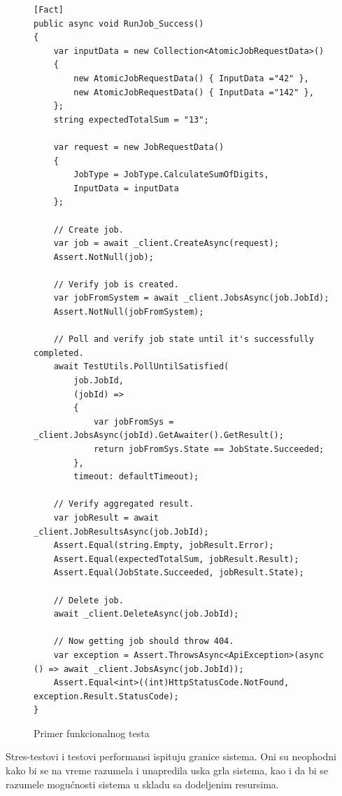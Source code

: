 \documentclass[12pt,oneside]{memoir}
\begin{document}
\begin{figure}[h!]
\centering
\begin{lstlisting}
[Fact]
public async void RunJob_Success()
{
	var inputData = new Collection<AtomicJobRequestData>()
	{
		new AtomicJobRequestData() { InputData ="42" },
		new AtomicJobRequestData() { InputData ="142" },
	};
	string expectedTotalSum = "13";

	var request = new JobRequestData()
	{
		JobType = JobType.CalculateSumOfDigits,
		InputData = inputData
	};

	// Create job.
	var job = await _client.CreateAsync(request);
	Assert.NotNull(job);

	// Verify job is created.
	var jobFromSystem = await _client.JobsAsync(job.JobId);
	Assert.NotNull(jobFromSystem);

	// Poll and verify job state until it's successfully completed.
	await TestUtils.PollUntilSatisfied(
		job.JobId,
		(jobId) =>
		{
			var jobFromSys = _client.JobsAsync(jobId).GetAwaiter().GetResult();
			return jobFromSys.State == JobState.Succeeded;
		},
		timeout: defaultTimeout);

	// Verify aggregated result.
	var jobResult = await _client.JobResultsAsync(job.JobId);
	Assert.Equal(string.Empty, jobResult.Error);
	Assert.Equal(expectedTotalSum, jobResult.Result);
	Assert.Equal(JobState.Succeeded, jobResult.State);

	// Delete job.
	await _client.DeleteAsync(job.JobId);

	// Now getting job should throw 404.
	var exception = Assert.ThrowsAsync<ApiException>(async () => await _client.JobsAsync(job.JobId));
	Assert.Equal<int>((int)HttpStatusCode.NotFound, exception.Result.StatusCode);
}
\end{lstlisting}
\caption{Primer funkcionalnog testa}
\label{fig:teste2e}
\end{figure}

Stres-testovi i testovi performansi ispituju granice sistema. Oni su neophodni kako bi se na vreme razumela i unapredila uska grla sistema, kao i da bi se razumele mogućnosti sistema u skladu sa dodeljenim resursima.



\end{document}
